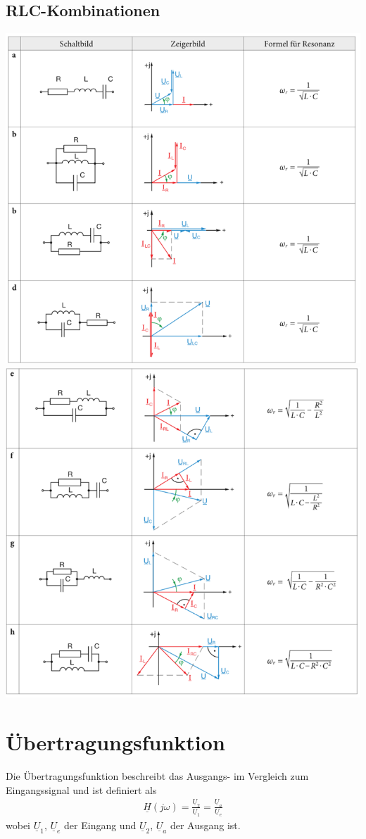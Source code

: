 \subsection{RLC-Kombinationen}
\begin{center}
\includegraphics[width=.75\linewidth]{LineareBauteile/RLC-1.png}
\vspace{0.5cm} \\
\includegraphics[width=.75\linewidth]{LineareBauteile/RLC-2.png}
\end{center}


\newpage

\section{Übertragungsfunktion}
Die Übertragungsfunktion beschreibt das Ausgangs- im Vergleich zum
Eingangssignal und ist definiert als
\begin{align}
    \underline{H}(j\omega)=\frac{\underline{U}_2}{\underline{U}_1}=\frac{\underline{U}_a}{\underline{U}_e}
\end{align}
wobei $\underline{U}_1$, $\underline{U}_e$ der Eingang und $\underline{U}_2$, $\underline{U}_a$ der Ausgang ist.

